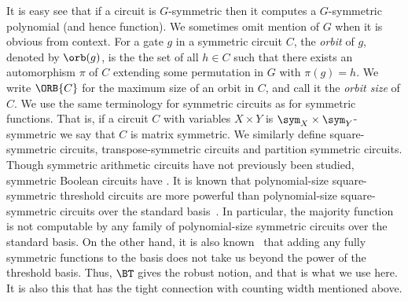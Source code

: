 \documentclass{toc}
\begin{document}
It is easy see that if a circuit is $G$-symmetric then it computes a
$G$-symmetric polynomial (and hence function). We sometimes omit mention of $G$
when it is obvious from context. For a gate $g$ in a symmetric circuit $C$, the
\emph{orbit} of $g$, denoted by $\orb(g)$, is the the set of all $h \in C$ such
that there exists an automorphism $\pi$ of $C$ extending some permutation in $G$ with $\pi(g) = h$. We write
$\ORB{C}$ for the maximum size of an orbit in $C$, and call it the \emph{orbit
  size} of $C$.
We use the same terminology for symmetric circuits as for symmetric functions.
That is, if a circuit $C$ with variables $X \times Y$ is $\sym_X \times
\sym_Y$-symmetric we say that $C$ is matrix symmetric. We similarly define
square-symmetric circuits, transpose-symmetric circuits and partition symmetric circuits. 
Though symmetric arithmetic circuits have not previously been studied, symmetric
Boolean circuits have \cite{DenenbergGS86,Otto96,AndersonD17,Rossman19}. It is known that
polynomial-size square-symmetric threshold circuits are more powerful than
polynomial-size square-symmetric circuits over the standard basis~\cite{AndersonD17}.
In particular, the majority function is not computable by any family of
polynomial-size symmetric circuits over the standard basis. On the other hand,
it is also known~\cite{DawarW22} that adding any fully symmetric functions to
the basis does not take us beyond the power of the threshold basis. Thus, $\BT$
gives the robust notion, and that is what we use here. It is also this that has
the tight connection with counting width mentioned above.
%
%
%
%
%
%
%
%
%
%
%
%
%
%
%
\end{document}

